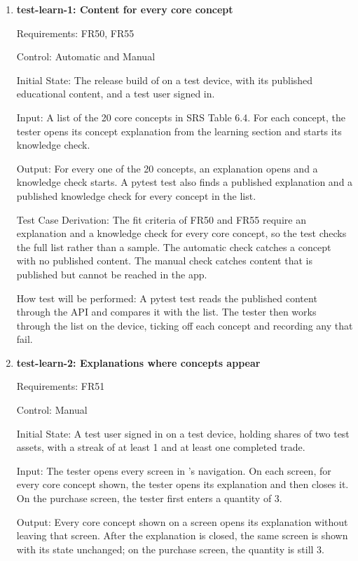 \documentclass[12pt, titlepage]{article}
\begin{document}
\begin{enumerate}

\item{\textbf{test-learn-1: Content for every core concept}\\}

Requirements: FR50, FR55

Control: Automatic and Manual

Initial State: The release build of \progname{} on a test device, with its
published educational content, and a test user signed in.

Input: A list of the 20 core concepts in SRS Table 6.4. For each concept, the
tester opens its concept explanation from the learning section and starts its
knowledge check.

Output: For every one of the 20 concepts, an explanation opens and a
knowledge check starts. A pytest test also finds a published explanation and
a published knowledge check for every concept in the list.

Test Case Derivation: The fit criteria of FR50 and FR55 require an explanation
and a knowledge check for every core concept, so the test checks the full
list rather than a sample. The automatic check catches a concept with no
published content. The manual check catches content that is published but
cannot be reached in the app.

How test will be performed: A pytest test reads the published content through
the API and compares it with the list. The tester then works through the list
on the device, ticking off each concept and recording any that fail.

\item{\textbf{test-learn-2: Explanations where concepts appear}\\}

Requirements: FR51

Control: Manual

Initial State: A test user signed in on a test device, holding shares of two
test assets, with a streak of at least 1 and at least one completed trade.

Input: The tester opens every screen in \progname{}'s navigation. On each
screen, for every core concept shown, the tester opens its explanation and
then closes it. On the purchase screen, the tester first enters a quantity of
3.

Output: Every core concept shown on a screen opens its explanation without
leaving that screen. After the explanation is closed, the same screen is shown
with its state unchanged; on the purchase screen, the quantity is still 3.


\end{enumerate}
\end{document}
